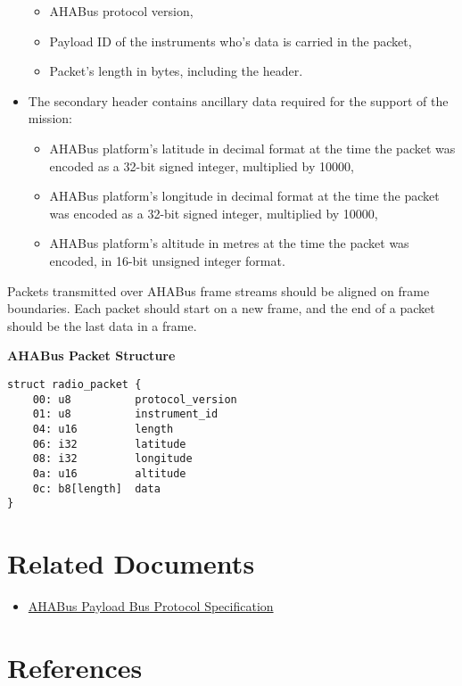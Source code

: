 \begin{appendices}
\begin{itemize}
  \begin{itemize}
  \item
    AHABus protocol version,
  \item
    Payload ID of the instruments who's data is carried in the packet,
  \item
    Packet's length in bytes, including the header.
  \end{itemize}
\item
  The secondary header contains ancillary data required for the support
  of the mission:

  \begin{itemize}
  \item
    AHABus platform's latitude in decimal format at the time the packet
    was encoded as a 32-bit signed integer, multiplied by 10000,
  \item
    AHABus platform's longitude in decimal format at the time the packet
    was encoded as a 32-bit signed integer, multiplied by 10000,
  \item
    AHABus platform's altitude in metres at the time the packet was
    encoded, in 16-bit unsigned integer format.
  \end{itemize}
\end{itemize}

Packets transmitted over AHABus frame streams should be aligned on frame
boundaries. Each packet should start on a new frame, and the end of a
packet should be the last data in a frame.

\textbf{AHABus Packet Structure}

\begin{verbatim}
struct radio_packet {
    00: u8          protocol_version
    01: u8          instrument_id
    04: u16         length
    06: i32         latitude
    08: i32         longitude
    0a: u16         altitude
    0c: b8[length]  data
}
\end{verbatim}

\section{Related Documents}\label{related-documents}

\begin{itemize}
\item
  \href{https://github.com/AHABus/src/software/payload-bus.md}{AHABus
  Payload Bus Protocol Specification}
\end{itemize}

\section{References}\label{references}


\end{appendices}
